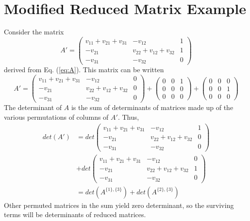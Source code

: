 \documentclass[review,supplement,hidelinks,onefignum,onetabnum]{siamart220329}
\begin{document}
    \section{Modified Reduced Matrix Example}
    Consider the matrix
\begin{equation}
    A' = \begin{pmatrix}
v_{11} + v_{21} + v_{31} & -v_{12} & 1 \\
-v_{21} & v_{22} + v_{12} + v_{32} & 1 \\
-v_{31}  & -v_{32}& 0
\end{pmatrix}
\end{equation}
derived from Eq. (\ref{eq:A}).  This matrix
can be written
\begin{equation}
A' = \begin{pmatrix}
v_{11} + v_{21} + v_{31} & -v_{12} & 0 \\
-v_{21} & v_{22} + v_{12} + v_{32} & 0 \\
-v_{31}  & -v_{32}& 0
\end{pmatrix}
+
\begin{pmatrix}
0 & 0 & 1 \\
0 & 0 & 0 \\
0 & 0 & 0
\end{pmatrix}
+
\begin{pmatrix}
0 & 0 & 0 \\
0 & 0 & 1 \\
0 & 0 & 0
\end{pmatrix}
\label{eq:mod1}
\end{equation}
The determinant of $A$ is the sum of determinants of matrices made up of the various permutations of columns of $A'$.  Thus,
\begin{equation}
\begin{split}
det(A') &= det\begin{pmatrix}
v_{11} + v_{21} + v_{31} & -v_{12} & 1 \\
-v_{21} & v_{22} + v_{12} + v_{32} & 0 \\
-v_{31}  & -v_{32}& 0
\end{pmatrix} \\
&+ 
det\begin{pmatrix}
v_{11} + v_{21} + v_{31} & -v_{12} & 0 \\
-v_{21} & v_{22} + v_{12} + v_{32} & 1 \\
-v_{31}  & -v_{32}& 0
\end{pmatrix} \\
&= det(A^{\{1\},\{3\}}) + det(A^{\{2\},\{3\}})
\end{split}
\label{eq:mod2}
\end{equation}
Other permuted matrices in the sum yield zero determinant, so the surviving terms will be determinants of reduced matrices.
\end{document}
